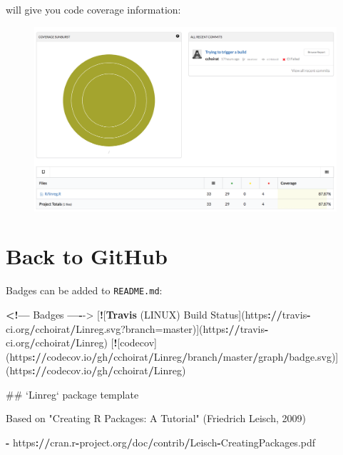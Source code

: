 \documentclass[]{book}
\newenvironment{Shaded}{\begin{snugshade}}{\end{snugshade}}
\newcommand{\KeywordTok}[1]{\textcolor[rgb]{0.13,0.29,0.53}{\textbf{#1}}}
\newcommand{\DataTypeTok}[1]{\textcolor[rgb]{0.13,0.29,0.53}{#1}}
\newcommand{\DecValTok}[1]{\textcolor[rgb]{0.00,0.00,0.81}{#1}}
\newcommand{\StringTok}[1]{\textcolor[rgb]{0.31,0.60,0.02}{#1}}
\newcommand{\OperatorTok}[1]{\textcolor[rgb]{0.81,0.36,0.00}{\textbf{#1}}}
\newcommand{\ErrorTok}[1]{\textcolor[rgb]{0.64,0.00,0.00}{\textbf{#1}}}
\newcommand{\NormalTok}[1]{#1}
\theoremstyle{definition}
\theoremstyle{definition}
\theoremstyle{definition}
\theoremstyle{remark}
\begin{document}
will give you code coverage information:

\begin{figure}

{\centering \includegraphics[width=23.92in]{images/ch3_codecov_out} 

}

\end{figure}

\section{Back to GitHub}\label{back-to-github}

Badges can be added to \texttt{README.md}:

\begin{Shaded}
\begin{Highlighting}[]
\OperatorTok{<!---}\StringTok{ }\NormalTok{Badges }\OperatorTok{----}\NormalTok{->}
\NormalTok{[}\OperatorTok{!}\NormalTok{[}\KeywordTok{Travis}\NormalTok{ (LINUX) Build Status](https}\OperatorTok{:}\ErrorTok{//}\NormalTok{travis}\OperatorTok{-}\NormalTok{ci.org}\OperatorTok{/}\NormalTok{cchoirat}\OperatorTok{/}\NormalTok{Linreg.svg?}\DataTypeTok{branch=}\NormalTok{master)](https}\OperatorTok{:}\ErrorTok{//}\NormalTok{travis}\OperatorTok{-}\NormalTok{ci.org}\OperatorTok{/}\NormalTok{cchoirat}\OperatorTok{/}\NormalTok{Linreg)}
\NormalTok{[}\OperatorTok{!}\NormalTok{[codecov](https}\OperatorTok{:}\ErrorTok{//}\NormalTok{codecov.io}\OperatorTok{/}\NormalTok{gh}\OperatorTok{/}\NormalTok{cchoirat}\OperatorTok{/}\NormalTok{Linreg}\OperatorTok{/}\NormalTok{branch}\OperatorTok{/}\NormalTok{master}\OperatorTok{/}\NormalTok{graph}\OperatorTok{/}\NormalTok{badge.svg)](https}\OperatorTok{:}\ErrorTok{//}\NormalTok{codecov.io}\OperatorTok{/}\NormalTok{gh}\OperatorTok{/}\NormalTok{cchoirat}\OperatorTok{/}\NormalTok{Linreg)}

\NormalTok{## `Linreg` package template}

\NormalTok{Based on }\StringTok{"Creating R Packages: A Tutorial"}\NormalTok{ (Friedrich Leisch, }\DecValTok{2009}\NormalTok{)}

\OperatorTok{-}\StringTok{ }\NormalTok{https}\OperatorTok{:}\ErrorTok{//}\NormalTok{cran.r}\OperatorTok{-}\NormalTok{project.org}\OperatorTok{/}\NormalTok{doc}\OperatorTok{/}\NormalTok{contrib}\OperatorTok{/}\NormalTok{Leisch}\OperatorTok{-}\NormalTok{CreatingPackages.pdf}
\end{Highlighting}
\end{Shaded}
\end{document}
